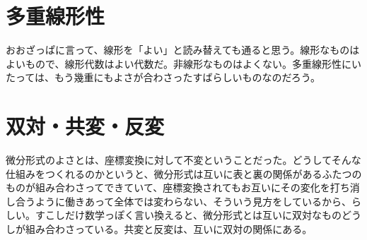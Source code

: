 \newpage


\section{多重線形性}

おおざっぱに言って、線形を「よい」と読み替えても通ると思う。線形なものはよいもので、線形代数はよい代数だ。非線形なものはよくない。多重線形性にいたっては、もう幾重にもよさが合わさったすばらしいものなのだろう。

\newpage


\section{双対・共変・反変}

微分形式のよさとは、座標変換に対して不変ということだった。どうしてそんな仕組みをつくれるのかというと、微分形式は互いに表と裏の関係があるふたつのものが組み合わさってできていて、座標変換されてもお互いにその変化を打ち消し合うように働きあって全体では変わらない、そういう見方をしているから、らしい。すこしだけ数学っぽく言い換えると、微分形式とは互いに双対なものどうしが組み合わさっている。共変と反変は、互いに双対の関係にある。

\newpage

\newpage

